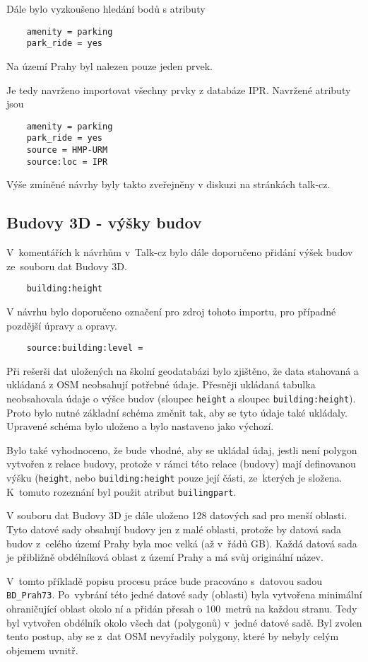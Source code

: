 Dále bylo vyzkoušeno hledání bodů s atributy
\begin{verbatim}
    amenity = parking
    park_ride = yes
\end{verbatim}
Na území Prahy byl nalezen pouze jeden prvek.

Je tedy navrženo importovat všechny prvky z databáze IPR.
Navržené atributy jsou
\begin{verbatim}
    amenity = parking
    park_ride = yes
    source = HMP-URM
    source:loc = IPR
\end{verbatim}

Výše zmíněné návrhy byly takto zveřejněny v diskuzi na stránkách
talk-cz.

\subsection{Budovy 3D - výšky budov}
\label{Budovy 3D - výšky budov}
V~komentářích k návrhům v~Talk-cz bylo dále doporučeno přidání
výšek budov ze~souboru dat Budovy 3D.
\begin{verbatim}
    building:height
\end{verbatim}
V návrhu bylo doporučeno označení pro zdroj tohoto importu, pro případné pozdější úpravy a opravy.
\begin{verbatim}
    source:building:level =
\end{verbatim}

Při rešerši dat uložených na školní geodatabázi bylo zjištěno,
že data stahovaná a ukládaná z OSM neobsahují potřebné údaje.
Přesněji ukládaná tabulka neobsahovala údaje o výšce budov
(sloupec {\tt height} a sloupec {\tt building\::height}).
Proto bylo nutné základní schéma změnit tak, aby se tyto údaje také 
ukládaly. Upravené schéma bylo uloženo a bylo nastaveno jako výchozí.

Bylo také vyhodnoceno, že bude vhodné, aby se ukládal údaj, jestli
není polygon vytvořen z relace budovy, protože v rámci této relace
(budovy) mají definovanou výšku ({\tt height}, nebo
{\tt building\::height} pouze její části, ze~kterých je složena.
K~tomuto rozeznání byl použit atribut {\tt builing\:part}.

V souboru dat Budovy 3D je dále uloženo 128 datových sad pro menší
oblasti. Tyto datové sady obsahují budovy jen z malé oblasti, protože
by datová sada budov z~celého území Prahy byla moc velká (až v~řádů
GB). Každá datová sada je přibližně obdélníková oblast z území Prahy a
má svůj originální název.

V~tomto příkladě popisu procesu práce bude pracováno s~datovou sadou
{\tt BD\_Prah73}. Po~vybrání této jedné datové sady (oblasti) byla
vytvořena minimální ohraničující oblast okolo ní a přidán přesah o
100~metrů na každou stranu. Tedy byl vytvořen obdélník okolo všech dat
(polygonů) v~jedné datové sadě. Byl zvolen tento postup, aby se z~dat
OSM nevyřadily polygony, které by nebyly celým objemem uvnitř.

